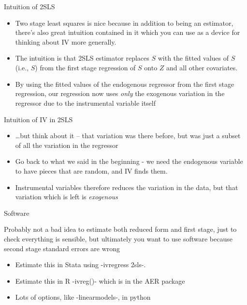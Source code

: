 \documentclass{beamer}
\begin{document}
\begin{frame}{Intuition of 2SLS}
	
	\begin{itemize}
	\item Two stage least squares is nice because in addition to being an estimator, there's also great intuition contained in it which you can use as a device for thinking about IV more generally. 
	\item The intuition is that 2SLS estimator replaces $S$ with the fitted values of $S$ (i.e., $\widehat{S}$) from the first stage regression of $S$ onto $Z$ and all other covariates.  
	\item By using the fitted values of the endogenous regressor from the first stage regression, our regression now uses \emph{only} the exogenous variation in the regressor due to the instrumental variable itself
	\end{itemize}
\end{frame}

\begin{frame}{Intuition of IV in 2SLS}

\begin{itemize}
	\item \dots but think about it -- that variation was there before, but was just a subset of all the variation in the regressor
	\item Go back to what we said in the beginning - we need the endogenous variable to have pieces that are random, and IV finds them.
	\item Instrumental variables therefore reduces the variation in the data, but that variation which is left is 
\emph{exogenous}
\end{itemize}

\end{frame}
	



\begin{frame}{Software}



Probably not a bad idea to estimate both reduced form and first stage, just to check everything is sensible, but ultimately you want to use software because second stage standard errors are wrong

\bigskip

\begin{itemize}
	\item Estimate this in Stata using -ivregress 2sls-.
	\item Estimate this in R -ivreg()- which is in the AER package
	\item Lots of options, like -linearmodels-, in python

\end{itemize}

\end{frame}
\end{document}
